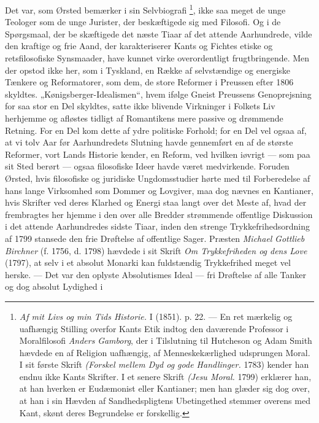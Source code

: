 \documentclass[12pt,a4paper,openany]{book}
\newcommand{\opage}[1]{\marginnote{\footnotesize\textit{[#1]}}}
\begin{document}
Det var, som Ørsted bemærker i sin Selvbiografi%
\footnote[1]{\textit{Af mit Livs og min Tids Historie.} I (1851). p. 22. --- En
ret mærkelig og uafhængig Stilling overfor Kants Etik indtog den daværende
Professor i Moralfilosofi \emph{Anders} \emph{Gamborg}, der i Tilslutning til
Hutcheson og Adam Smith hævdede en af Religion uafhængig, af Menneskekærlighed
udsprungen Moral. I sit første Skrift \textit{(Forskel mellem Dyd og gode
Handlinger.} 1783) kender han endnu ikke Kants Skrifter. I et senere Skrift
\textit{(Jesu Moral.} 1799) erklærer han, at han hverken er Eudæmonist eller
Kantianer; men han glæder sig dog over, at han i sin Hævden af Sandhedspligtens
Ubetingethed stemmer overens med Kant, skønt deres Begrundelse er forskellig.},
ikke saa meget de unge Teologer som de unge Jurister, der beskæftigede sig med
Filosofi. Og i de Spørgsmaal, der be%
\setcounter{footnote}{0}%
\opage{28}skæftigede det næste Tiaar af det attende Aarhundrede, vilde den
kraftige og frie Aand, der karakteriserer Kants og Fichtes etiske og
retsfilosofiske Synsmaader, have kunnet virke overordentligt frugtbringende.
Men der opstod ikke her, som i Tyskland, en Række af selvstændige og energiske
Tænkere og Reformatorer, som dem, de store Reformer i Preussen efter 1806
skyldtes. „Kønigsberger-Idealismen“, hvem ifølge Gneist Preussens Genoprejsning
for saa stor en Del skyldtes, satte ikke blivende Virkninger i Folkets Liv
herhjemme og afløstes tidligt af Romantikens mere passive og drømmende Retning.
For en Del kom dette af ydre politiske Forhold; for en Del vel ogsaa af, at vi
tolv Aar før Aarhundredets Slutning havde gennemført en af de største Reformer,
vort Lands Historie kender, en Reform, ved hvilken iøvrigt --- som paa sit Sted
berørt --- ogsaa filosofiske Ideer havde været medvirkende. Foruden Ørsted,
hvis filosofiske og juridiske Ungdomsstudier hørte med til Forberedelse af hans
lange Virksomhed som Dommer og Lovgiver, maa dog nævnes en Kantianer, hvis
Skrifter ved deres Klarhed og Energi staa langt over det Meste af, hvad der
frembragtes her hjemme i den over alle Bredder strømmende offentlige Diskussion
i det attende Aarhundredes sidste Tiaar, inden den strenge Trykkefrihedsordning
af 1799 stansede den frie Drøftelse af offentlige Sager. Præsten \emph{Michael}
\emph{Gottlieb} \emph{Birchner} (f. 1756, d. 1798) hævdede i sit Skrift
\textit{Om Trykkefriheden og dens Love} (1797), at selv i et absolut Monarki
kan fuldstændig Trykkefrihed meget vel herske. --- Det var den oplyste
Absolutismes Ideal --- fri Drøftelse af alle Tanker og dog absolut Lydighed i
\end{document}
